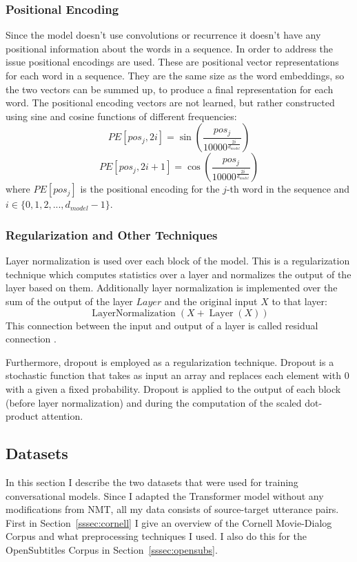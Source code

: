 \documentclass[12pt]{article}
\DeclareMathOperator{\Layer}{Layer}
\DeclareMathOperator{\LayerNormalization}{LayerNormalization}
\begin{document}
\subsubsection{Positional Encoding} \label{sssec:positional}
Since the model doesn't use convolutions or recurrence it doesn't have any positional information about the words in a sequence. In order to address the issue positional encodings are used. These are positional vector representations for each word in a sequence. They are the same size as the word embeddings, so the two vectors can be summed up, to produce a final representation for each word. The positional encoding vectors are not learned, but rather constructed using sine and cosine functions of different frequencies:
\begin{equation}
PE[pos_j,2i]=\sin\left(\frac{pos_j}{10000^{\frac{2i}{d_{model}}}}\right)
\end{equation}
\begin{equation}
PE[pos_j,2i+1]=\cos\left(\frac{pos_j}{10000^{\frac{2i}{d_{model}}}}\right) 
\end{equation}
where \(PE[pos_j]\) is the positional encoding for the \(j\)-th word in the sequence and \(i \in \{0,1,2,...,d_{model}-1\}\).

\subsubsection{Regularization and Other Techniques} \label{sssec:regularization}
Layer normalization \cite{Ba:2016} is used over each block of the model. This is a regularization technique which computes statistics over a layer and normalizes the output of the layer based on them. Additionally layer normalization is implemented over the sum of the output of the layer \(Layer\) and the original input \(X\) to that layer:
\begin{equation}
\LayerNormalization(X+\Layer(X))
\end{equation}
This connection between the input and output of a layer is called residual connection \cite{He:2016}.

Furthermore, dropout \cite{Dropout:2014} is employed as a regularization technique. Dropout is a stochastic function that takes as input an array and replaces each element with 0 with a given a fixed probability. Dropout is applied to the output of each block (before layer normalization) and during the computation of the scaled dot-product attention. 

\subsection{Datasets} \label{ssec:42}
In this section I describe the two datasets that were used for training conversational models. Since I adapted the Transformer model without any modifications from NMT, all my data consists of source-target utterance pairs. First in Section~\ref{sssec:cornell} I give an overview of the Cornell Movie-Dialog Corpus \cite{Danescu:2011} and what preprocessing techniques I used. I also do this for the OpenSubtitles Corpus \cite{Tiedemann:2009} in Section~\ref{sssec:opensubs}.
\end{document}
